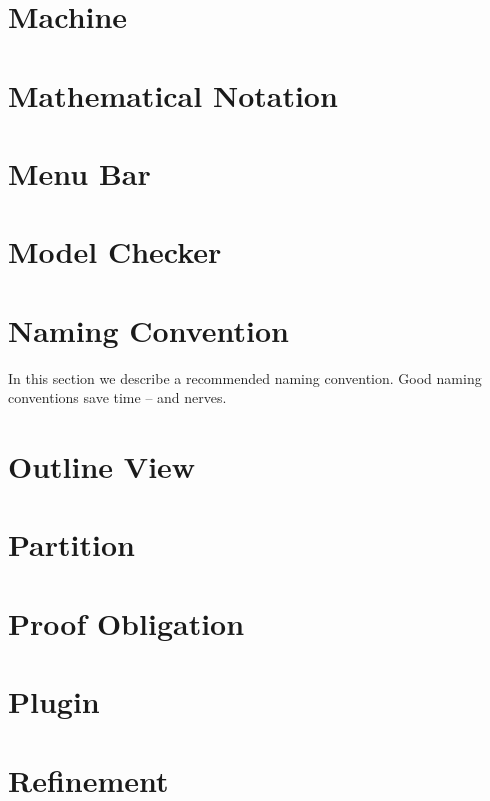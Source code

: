 \section{Machine}
\label{machine}

\section{Mathematical Notation}
\label{mathematical_notation}

\section{Menu Bar}
\label{menu_bar}

\section{Model Checker}
\label{model_checker}

\section{Naming Convention}
\label{naming_convention}

In this section we describe a recommended naming convention.  Good naming conventions save time -- and nerves.

\section{Outline View}
\label{outline_view}

\section{Partition}
\label{partition}

\section{Proof Obligation}
\label{proof_obligation}

\section{Plugin}
\label{plugin}

\section{Refinement}
\label{refinement}

